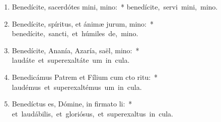 \begin{flushleft}
\begin{enumerate}[leftmargin=*]
\item Benedícite, sacerdótes mini, mino:~* \mbox{benedícite, servi mini, mino.}
\item Benedícite, spíritus, et ánimæ jurum, mino:~* \mbox{benedícite, sancti, et húmiles de, mino.}
\item Benedícite, Ananía, Azaría, saël, mino:~* \mbox{laudáte et superexaltáte um in cula.}
\item Benedicámus Patrem et Fílium cum cto ritu:~* \mbox{laudémus et superexaltémus um in cula.}
\item Benedíctus es, Dómine, in firmato li:~* \mbox{et laudábilis, et gloriósus, et superexaltus in cula.}


\end{enumerate}
\end{flushleft}

